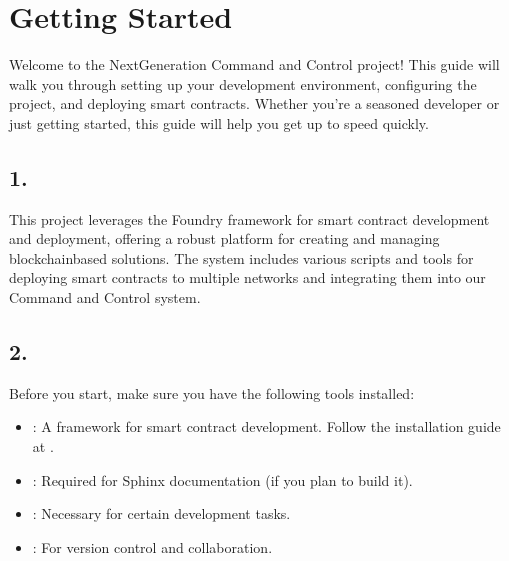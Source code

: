 \documentclass[letterpaper,10pt,english]{sphinxmanual}
\begin{document}
\sphinxstepscope


\chapter{Getting Started}
\label{\detokenize{quickstart:getting-started}}\label{\detokenize{quickstart::doc}}
\sphinxAtStartPar
Welcome to the Next\sphinxhyphen{}Generation Command and Control project! This guide will walk you through setting up your development environment, configuring the project, and deploying smart contracts. Whether you’re a seasoned developer or just getting started, this guide will help you get up to speed quickly.


\section{1. }
\label{\detokenize{quickstart:introduction}}
\sphinxAtStartPar
This project leverages the Foundry framework for smart contract development and deployment, offering a robust platform for creating and managing blockchain\sphinxhyphen{}based solutions. The system includes various scripts and tools for deploying smart contracts to multiple networks and integrating them into our Command and Control system.


\section{2. }
\label{\detokenize{quickstart:prerequisites}}\label{\detokenize{quickstart:id1}}
\sphinxAtStartPar
Before you start, make sure you have the following tools installed:
\begin{itemize}
\item {} 
\sphinxAtStartPar
{}: A framework for smart contract development. Follow the installation guide at .

\item {} 
\sphinxAtStartPar
{}: Required for Sphinx documentation (if you plan to build it).

\item {} 
\sphinxAtStartPar
{}: Necessary for certain development tasks.

\item {} 
\sphinxAtStartPar
{}: For version control and collaboration.

\end{itemize}
\end{document}
